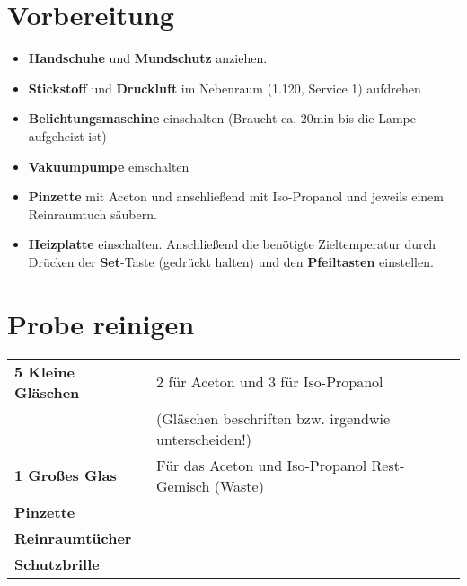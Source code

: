 \documentclass[12pt,a4paper]{article}
\begin{document}
\section{Vorbereitung}
\begin{itemize}
\item \textbf{Handschuhe} und \textbf{Mundschutz} anziehen.
\item \textbf{Stickstoff} und \textbf{Druckluft} im Nebenraum (1.120, Service 1) aufdrehen
\item \textbf{Belichtungsmaschine} einschalten (Braucht ca. 20min bis die Lampe aufgeheizt ist)


\item \textbf{Vakuumpumpe} einschalten
\item \textbf{Pinzette} mit Aceton und anschließend mit Iso-Propanol und jeweils einem Reinraumtuch säubern.
\item \textbf{Heizplatte} einschalten. Anschließend die benötigte Zieltemperatur durch Drücken der \textbf{Set}-Taste (gedrückt halten) und den \textbf{Pfeiltasten} einstellen.
\end{itemize}

\newpage

\section{Probe reinigen}
\begin{center}
\begin{tabular}{| l | p{10cm} |} \hline
\textbf{5 Kleine Gläschen} & 2 für Aceton und 3 für Iso-Propanol\\
& (Gläschen beschriften bzw. irgendwie unterscheiden!)\\ \hline
\textbf{1 Großes Glas} & Für das Aceton und Iso-Propanol Rest-Gemisch (Waste)\\ \hline
\textbf{Pinzette} & \\
\textbf{Reinraumtücher} & \\
\textbf{Schutzbrille} & \\ \hline
\end{tabular}
\end{center}
\end{document}
